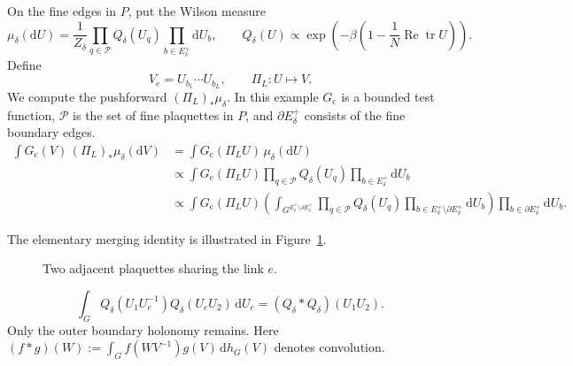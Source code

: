 \documentclass[10pt,reqno]{amsart}
\theoremstyle{definition}
\theoremstyle{remark}
\numberwithin{equation}{section}
\numberwithin{figure}{section}
\newcommand{\dd}{\mathrm d}
\newcommand{\Gc}{G_{\mathrm c}}
\DeclareMathOperator{\tr}{tr}
\begin{document}
On the fine edges in $P$, put the Wilson measure
\begin{equation}\label{eq:display-043}
\mu_\delta(\dd U)=\frac1{Z_\delta}\prod_{q\in\mathcal P}Q_\delta(U_q)
\prod_{b\in E_\delta^+}\dd U_b,
\qquad
Q_\delta(U)\propto\exp\left(-\beta\left(1-\frac1N\operatorname{Re}\tr U\right)\right).
\end{equation}
Define
\begin{equation}\label{eq:display-044}
V_e=U_{b_1}\cdots U_{b_L},
\qquad\Pi_L:U\longmapsto V.
\end{equation}
We compute the pushforward $(\Pi_L)_*\mu_\delta$. In this example $\Gc$ is a bounded test function, $\mathcal P$ is the set of fine plaquettes in $P$, and $\partial E_\delta^+$ consists of the fine boundary edges.
\begin{equation}\label{eq:display-045}
\begin{aligned}
\int\Gc(V)\,(\Pi_L)_*\mu_\delta(\dd V)
&=\int\Gc(\Pi_LU)\,\mu_\delta(\dd U)\\
&\propto\int\Gc(\Pi_LU)\prod_{q\in\mathcal P}Q_\delta(U_q)
 \prod_{b\in E_\delta^+}\dd U_b\\
&\propto\int\Gc(\Pi_LU)
 \left(\int_{G^{E_\delta^+\setminus\partial E_\delta^+}}
 \prod_{q\in\mathcal P}Q_\delta(U_q)
 \prod_{b\in E_\delta^+\setminus\partial E_\delta^+}\dd U_b\right)
 \prod_{b\in\partial E_\delta^+}\dd U_b.
\end{aligned}
\end{equation}

The elementary merging identity is illustrated in Figure~\ref{fig:merging}.
\begin{figure}[htbp]
\centering
{}
\caption{Two adjacent plaquettes sharing the link $e$.}
\label{fig:merging}
\end{figure}

\begin{equation}\label{eq:display-046}
\int_GQ_\delta(U_1U_e^{-1})Q_\delta(U_eU_2)\,\dd U_e =(Q_\delta*Q_\delta)(U_1U_2).
\end{equation}
Only the outer boundary holonomy remains. Here $(f*g)(W):=\int_G f(WV^{-1})g(V)\,\dd h_G(V)$ denotes convolution.
\end{document}
